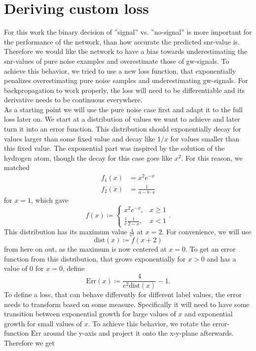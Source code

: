 \section{Deriving custom loss}
For this work the binary decision of ''signal'' vs. ''no-signal'' is more important for the performance of the network, than how accurate the predicted \gls{snr}-value is. Therefore we would like the network to have a bias towards underestimating the \gls{snr}-values of pure noise examples and overestimate those of \gls{gw}-signals. To achieve this behavior, we tried to use a new loss function, that exponentially penalizes overestimating pure noise samples and underestimating \gls{gw}-signals. For backpropagation to work properly, the loss will need to be differentiable and its derivative needs to be continuous everywhere.\\
As a starting point we will use the pure noise case first and adapt it to the full loss later on. We start at a distribution of values we want to achieve and later turn it into an error function. This distribution should exponentially decay for values larger than some fixed value and decay like $1/x$ for values smaller than this fixed value. The exponential part was inspired by the solution of the hydrogen atom, though the decay for this case goes like $x^2$. For this reason, we matched
\begin{align}
f_1(x) & = x^2 e^{-x}\\
f_2(x) & = \frac{1}{a-b\cdot x}
\end{align}
for $x=1$, which gave
\begin{equation}
f(x)\coloneqq
\begin{cases}
	x^2 e^{-x}, & x \geq 1\\
	\frac{1}{e}\frac{1}{2-x}, & x < 1
\end{cases}.
\end{equation}
This distribution has its maximum value $\frac{4}{e^2}$ at $x=2$. For convenience, we will use
\begin{equation}
\text{dist}(x)\coloneqq f(x+2)
\end{equation}
from here on out, as the maximum is now centered at $x=0$. To get an error function from this distribution, that grows exponentially for $x>0$ and has a value of $0$ for $x=0$, define
\begin{equation}
\text{Err}(x)\coloneqq \frac{4}{e^2 \text{dist}(x)} - 1.
\end{equation}
To define a loss, that can behave differently for different label values, the error needs to transform based on some measure. Specifically it will need to have some transition between exponential growth for large values of $x$ and exponential growth for small values of $x$. To achieve this behavior, we rotate the error-function $\text{Err}$ around the y-axis and project it onto the x-y-plane afterwards. Therefore we get
